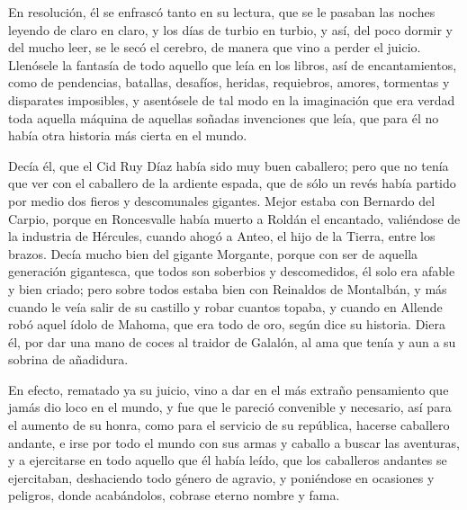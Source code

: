 En resolución, él se enfrascó tanto en su lectura, que se le pasaban
las noches leyendo de claro en claro, y los días de turbio en turbio,
y así, del poco dormir y del mucho leer, se le secó el cerebro, de
manera que vino a perder el juicio. Llenósele la fantasía de todo
aquello que leía en los libros, así de encantamientos, como de
pendencias, batallas, desafíos, heridas, requiebros, amores, tormentas
y disparates imposibles, y asentósele de tal modo en la imaginación
que era verdad toda aquella máquina de aquellas soñadas invenciones
que leía, que para él no había otra historia más cierta en el mundo.

Decía él, que el Cid Ruy Díaz había sido muy buen caballero; pero que
no tenía que ver con el caballero de la ardiente espada, que de sólo
un revés había partido por medio dos fieros y descomunales gigantes.
Mejor estaba con Bernardo del Carpio, porque en Roncesvalle había
muerto a Roldán el encantado, valiéndose de la industria de Hércules,
cuando ahogó a Anteo, el hijo de la Tierra, entre los brazos. Decía
mucho bien del gigante Morgante, porque con ser de aquella generación
gigantesca, que todos son soberbios y descomedidos, él solo era afable
y bien criado; pero sobre todos estaba bien con Reinaldos de
Montalbán, y más cuando le veía salir de su castillo y robar cuantos
topaba, y cuando en Allende robó aquel ídolo de Mahoma, que era todo
de oro, según dice su historia. Diera él, por dar una mano de coces al
traidor de Galalón, al ama que tenía y aun a su sobrina de añadidura.

En efecto, rematado ya su juicio, vino a dar en el más extraño
pensamiento que jamás dio loco en el mundo, y fue que le pareció
convenible y necesario, así para el aumento de su honra, como para el
servicio de su república, hacerse caballero andante, e irse por todo
el mundo con sus armas y caballo a buscar las aventuras, y a
ejercitarse en todo aquello que él había leído, que los caballeros
andantes se ejercitaban, deshaciendo todo género de agravio, y
poniéndose en ocasiones y peligros, donde acabándolos, cobrase eterno
nombre y fama.

